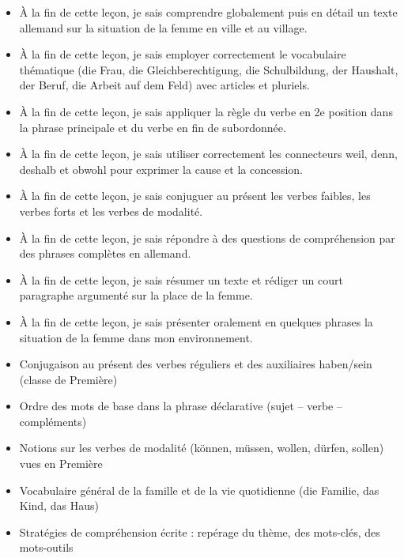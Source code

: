 \documentclass[11pt]{article}
\begin{document}
\begin{objectifs}
\begin{itemize}
\item À la fin de cette leçon, je sais comprendre globalement puis en détail un texte allemand sur la situation de la femme en ville et au village.
\item À la fin de cette leçon, je sais employer correctement le vocabulaire thématique (die Frau, die Gleichberechtigung, die Schulbildung, der Haushalt, der Beruf, die Arbeit auf dem Feld) avec articles et pluriels.
\item À la fin de cette leçon, je sais appliquer la règle du verbe en 2e position dans la phrase principale et du verbe en fin de subordonnée.
\item À la fin de cette leçon, je sais utiliser correctement les connecteurs weil, denn, deshalb et obwohl pour exprimer la cause et la concession.
\item À la fin de cette leçon, je sais conjuguer au présent les verbes faibles, les verbes forts et les verbes de modalité.
\item À la fin de cette leçon, je sais répondre à des questions de compréhension par des phrases complètes en allemand.
\item À la fin de cette leçon, je sais résumer un texte et rédiger un court paragraphe argumenté sur la place de la femme.
\item À la fin de cette leçon, je sais présenter oralement en quelques phrases la situation de la femme dans mon environnement.
\end{itemize}
\end{objectifs}

\begin{prerequis}
\begin{itemize}
\item Conjugaison au présent des verbes réguliers et des auxiliaires haben/sein (classe de Première)
\item Ordre des mots de base dans la phrase déclarative (sujet – verbe – compléments)
\item Notions sur les verbes de modalité (können, müssen, wollen, dürfen, sollen) vues en Première
\item Vocabulaire général de la famille et de la vie quotidienne (die Familie, das Kind, das Haus)
\item Stratégies de compréhension écrite : repérage du thème, des mots-clés, des mots-outils
\end{itemize}
\end{prerequis}
\end{document}
